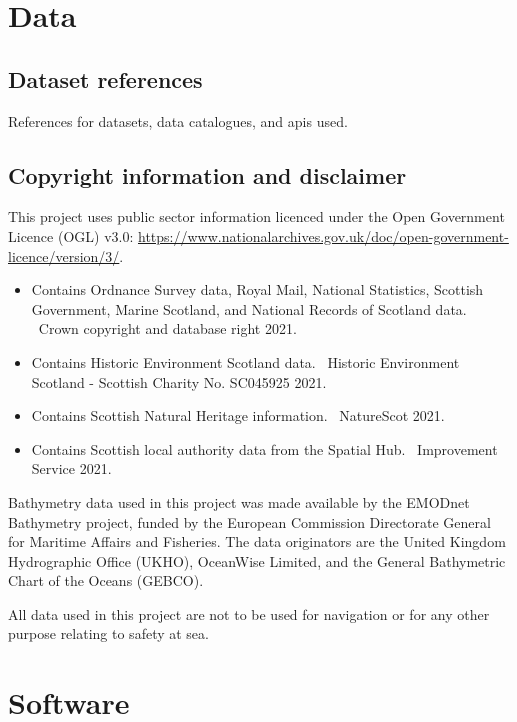 \chapter{Data \label{app:data}}

\section*{Dataset references}

References for datasets, data catalogues, and \glspl{api} used.

\printbibliography[heading=none,keyword=data]

\section*{Copyright information and disclaimer}

This project uses public sector information licenced under the Open Government Licence (OGL) v3.0:
\url{https://www.nationalarchives.gov.uk/doc/open-government-licence/version/3/}.

\begin{itemize}[noitemsep]
  \item Contains Ordnance Survey data, Royal Mail, National Statistics, Scottish Government, Marine Scotland, and National Records of Scotland data. \textcopyright~Crown copyright and database right 2021.
  \item Contains Historic Environment Scotland data. \textcopyright~Historic Environment Scotland - Scottish Charity No. SC045925 2021.
  \item Contains Scottish Natural Heritage information. \textcopyright~NatureScot 2021.
  \item Contains Scottish local authority data from the Spatial Hub. \textcopyright~Improvement Service 2021.
\end{itemize}

Bathymetry data used in this project was made available by the EMODnet Bathymetry project, funded by the European Commission Directorate General for Maritime Affairs and Fisheries. The data originators are the United Kingdom Hydrographic Office (UKHO), OceanWise Limited, and the General Bathymetric Chart of the Oceans (GEBCO).

All data used in this project are not to be used for navigation or for any other purpose relating to safety at sea.

\chapter{Software \label{app:soft}}

